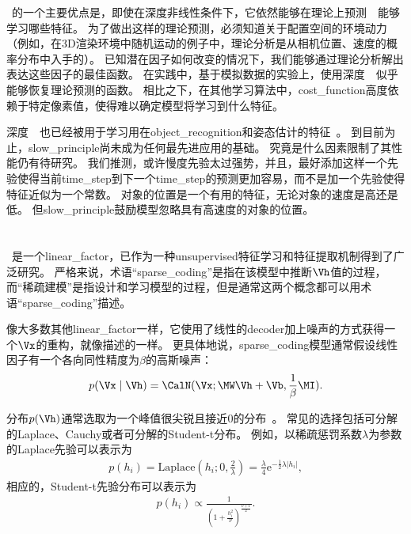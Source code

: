 ~的一个主要优点是，即使在深度非线性条件下，它依然能够在理论上预测~~能够学习哪些特征。
为了做出这样的理论预测，必须知道关于配置空间的环境动力（例如，在3D渲染环境中随机运动的例子中，理论分析是从相机位置、速度的概率分布中入手的）。
已知潜在因子如何改变的情况下，我们能够通过理论分析解出表达这些因子的最佳函数。
在实践中，基于模拟数据的实验上，使用深度~~似乎能够恢复理论预测的函数。
相比之下，在其他学习算法中，\gls{cost_function}高度依赖于特定像素值，使得难以确定模型将学习到什么特征。


深度~~也已经被用于学习用在\gls{object_recognition}和姿态估计的特征~\citep{Franzius2008}。
到目前为止，\gls{slow_principle}尚未成为任何最先进应用的基础。
究竟是什么因素限制了其性能仍有待研究。
我们推测，或许慢度先验太过强势，并且，最好添加这样一个先验使得当前\gls{time_step}到下一个\gls{time_step}的预测更加容易，而不是加一个先验使得特征近似为一个常数。
对象的位置是一个有用的特征，无论对象的速度是高还是低。 
但\gls{slow_principle}鼓励模型忽略具有高速度的对象的位置。


\section{}
\label{sec:sparse_coding}


~\citep{Olshausen+Field-1996}是一个\gls{linear_factor}，已作为一种\gls{unsupervised}特征学习和特征提取机制得到了广泛研究。
严格来说，术语``\gls{sparse_coding}''是指在该模型中推断$\Vh$值的过程，而``稀疏建模''是指设计和学习模型的过程，但是通常这两个概念都可以用术语``\gls{sparse_coding}''描述。

像大多数其他\gls{linear_factor}一样，它使用了线性的\gls{decoder}加上噪声的方式获得一个$\Vx$的重构，就像描述的一样。
更具体地说，\gls{sparse_coding}模型通常假设线性因子有一个各向同性精度为$\beta$的高斯噪声：
\begin{align}
\label{eqn:1312}
p(\Vx\mid \Vh) = \CalN
(\Vx;\MW\Vh + \Vb ,\frac{1}{\beta}\MI).
\end{align}


分布$p(\Vh)$通常选取为一个峰值很尖锐且接近$0$的分布~\citep{Olshausen+Field-1996}。
常见的选择包括可分解的Laplace、Cauchy或者可分解的Student-t分布。
例如，以稀疏惩罚系数$\lambda$为参数的Laplace先验可以表示为
\begin{align}
\label{eqn:1313}
p(h_i) = \text{Laplace}(h_i;0,\frac{2}{\lambda}) = \frac{\lambda}{4} \text{e}^{ -\frac{1}{2}\lambda \vert h_i\vert},
\end{align}
相应的，Student-t先验分布可以表示为
\begin{align}
\label{eqn:1314}
p(h_i)\propto \frac{1}{(1+\frac{h_i^2}{\nu})^{\frac{\nu+1}{2}}}.
\end{align}


